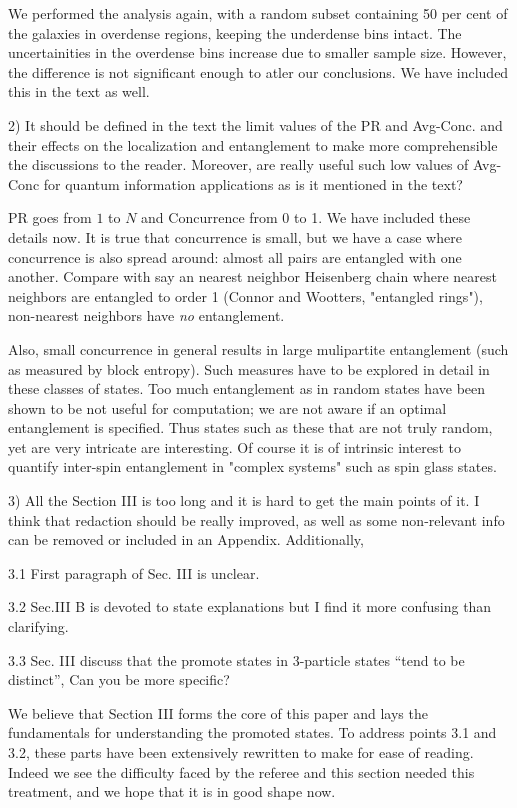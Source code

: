 \documentclass[english]{letter}
\begin{document}
We performed the analysis again, with a random subset containing 50 per cent of the galaxies in overdense regions, keeping the underdense bins intact. The uncertainities in the overdense bins increase due to smaller sample size. However, the difference is not significant enough to atler our conclusions. We have included this in the text as well.

\begin{shaded}
2) It should be defined in the text the limit values of the PR and
Avg-Conc. and their effects on the localization and entanglement to
make more comprehensible the discussions to the reader. Moreover, are
really useful such low values of Avg-Conc for quantum information
applications as is it mentioned in the text?
\end{shaded}

PR goes from $1$ to $N$ and Concurrence from 0 to 1. We have included
these details now.
It is true that concurrence is small, but we have a case
where concurrence is also spread around: almost all pairs are
entangled with one another. Compare with say an nearest neighbor Heisenberg chain where 
nearest neighbors are entangled to order 1 (Connor and Wootters, 
"entangled rings"), non-nearest neighbors have {\it no} entanglement.

 Also, small concurrence in general results
in large mulipartite entanglement (such as measured by block entropy).
Such measures have to be explored in detail in these classes of
states. Too much entanglement as in random states  have been shown
to be not useful for computation; we are not aware if an optimal entanglement is specified.
Thus states such as these that are not truly random, yet are very intricate are interesting.
 Of course it is of intrinsic interest to quantify inter-spin entanglement in "complex systems" such as spin glass states.

\begin{shaded}
3) All the Section III is too long and it is hard to get the main
points of it. I think that redaction should be really improved, as
well as some non-relevant info can be removed or included in an
Appendix. Additionally,

3.1 First paragraph of Sec. III is unclear.

3.2 Sec.III B is devoted to state explanations but I find it more
confusing than clarifying.

3.3 Sec. III discuss that the promote states in 3-particle states
“tend to be distinct”, Can you be more specific?
\end{shaded}
\noindent
We believe that Section III forms the core of this paper and lays the fundamentals for understanding the promoted states.
To address points  3.1 and 3.2, these parts have been extensively rewritten to make for ease of reading.
Indeed we see the difficulty faced by the referee and this section needed this treatment, and we hope that it
is in good shape now.
\end{document}
